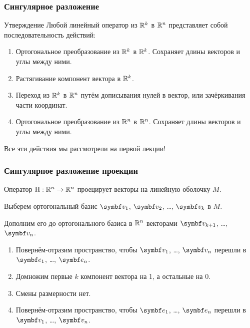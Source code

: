 
    



\begin{frame}
  \frametitle{Сингулярное разложение}

  \begin{block}{Утверждение}
    Любой линейный оператор из $\mathbb{R}^k$ в $\mathbb{R}^n$ представляет собой последовательность действий: \pause

    \begin{enumerate}
      \item Ортогональное преобразование из $\mathbb{R}^k$ в $\mathbb{R}^k$. Сохраняет длины векторов и углы между ними. \pause
      \item Растягивание компонент вектора в $\mathbb{R}^k$. \pause
      \item Переход из $\mathbb{R}^k$ в $\mathbb{R}^n$ путём дописывания нулей в вектор, или зачёркивания части координат. \pause
      \item Ортогональное преобразование из $\mathbb{R}^n$ в $\mathbb{R}^n$. Сохраняет длины векторов и углы между ними. \pause
    \end{enumerate}  
  \end{block}

  Все эти действия мы рассмотрели на первой лекции!

\end{frame}


\begin{frame}
  \frametitle{Сингулярное разложение проекции}

  Оператор $\mathrm{H}: \mathbb{R}^n \to \mathbb{R}^n$ проецирует векторы на линейную оболочку $M$. \pause

  Выберем ортогональный базис $\bv_1$, $\bv_2$, \ldots, $\bv_k$ в $M$. \pause

  Дополним его до ортогонального базиса в $\mathbb{R}^n$ векторами $\bv_{k+1}$, \ldots, $\bv_n$. \pause


  \begin{enumerate}
    \item Повернём-отразим пространство, чтобы $\bv_1$, \ldots, $\bv_n$ перешли в $\be_1$, \ldots, $\be_n$. \pause
    \item Домножим первые $k$ компонент вектора на 1, а остальные на 0.  \pause
    \item Смены размерности нет. \pause
   \item Повернём-отразим пространство, чтобы $\be_1$, \ldots, $\be_n$ перешли в $\bv_1$, \ldots, $\bv_n$. 
  \end{enumerate}  

\end{frame}



